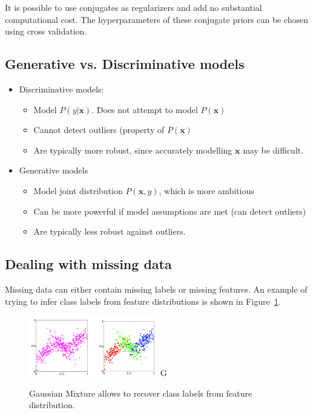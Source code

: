 \documentclass[a4paper,10pt,twoside]{article}
\begin{document}
It is possible to use conjugates as regularizers and add no substantial computational cost. The hyperparameters of these conjugate priors can be chosen using cross validation.

\subsection{Generative vs. Discriminative models}

\begin{itemize}
\item Discriminative models:
  \begin{itemize}
  \item Model $P(y|\mathbf{x})$. Does not attempt to model $P(\mathbf{x})$
  \item Cannot detect outliers (property of $P(\mathbf{x})$
  \item Are typically more robust, since accurately modelling $\mathbf{x}$ may be difficult.
\end{itemize}
\item Generative models
  \begin{itemize}
  \item Model joint distribution $P(\mathbf{x},y)$, which is more ambitious
  \item Can be more powerful if model assumptions are met (can detect outliers)
  \item Are typically less robust against outliers.
  \end{itemize}
\end{itemize}

\subsection{Dealing with missing data}

Missing data can either contain missing labels or missing features. An example of trying to infer class labels from feature distributions is shown in Figure~\ref{fig:gaussian_missing_data}.

\begin{figure}
  \centering
  \includegraphics[width=0.5\textwidth]{figures/Gaussian_Mixtures.png}
G \caption{Gaussian Mixture allows to recover class labels from feature distribution.}
  \label{fig:gaussian_missing_data}
\end{figure}
\end{document}
